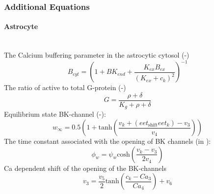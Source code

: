 \subsubsection{Additional Equations}
\paragraph{Astrocyte}~\\
The Calcium buffering parameter in the astrocytic cytosol (-)
\begin{equation} \label{eq:B_cyt}
B_{cyt}=\left(1+BK_{end}+ \frac{K_{ex}B_{ex}}{(K_{ex}+c_k)^2}\right)^{-1} 
\end{equation}
The ratio of active to total G-protein (-)
\begin{equation} \label{eq:G}
G=\frac{\rho+\delta}{K_g+\rho+\delta}
\end{equation}
Equilibrium state BK-channel (-):
\begin{equation} \label{eq:winf}
w_{\infty}=0.5 \left(1+\mathrm{tanh}\left(\frac{v_{k}+(eet_{\mathrm{shift}}eet_k)-v_{3} }{v_{4}} \right)  \right) 
\end{equation}
%
The time constant associated with the opening of BK channels	 (in \pers):
\begin{equation} \label{eq:phin}
\phi_{w}=\psi_{w}\mathrm{cosh}\left( \frac{v_{k}-v_{3}}{2v_{4}}\right) 
\end{equation}
\gls{Ca} dependent shift of the opening of the BK-channels
\begin{equation} \label{eq:v_3}
v_{3}=\frac{v_5}{2}\mathrm{tanh}\left( \frac{c_k-Ca_3}{Ca_4}\right)+v_6 
\end{equation}

